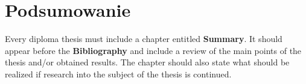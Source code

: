 \chapter{Podsumowanie}

Every diploma thesis must include a chapter entitled \textbf{Summary}. It should appear before the \textbf{Bibliography} and include a review of the main points of the thesis and/or obtained results. The chapter should also state what should be realized if research into the subject of the thesis is continued.